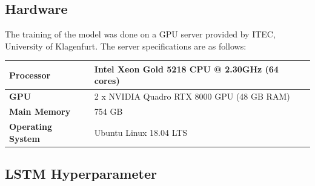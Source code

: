   \subsection{Hardware}
  \label{sec:hardware}

    The training of the  model was done on a GPU server provided by ITEC, University of Klagenfurt. The server specifications are as follows:

    \begin{center}
      \begin{tabular}{| l | l |}
        \hline
        \textbf{Processor}   &   Intel Xeon Gold 5218 CPU @ 2.30GHz (64 cores) \\ \hline
        \textbf{GPU}         &   2 x NVIDIA Quadro RTX 8000 GPU (48 GB RAM)    \\ \hline
        \textbf{Main Memory} &   754 GB                                        \\ \hline
        \textbf{Operating System} &  Ubuntu Linux 18.04 LTS                    \\ \hline

        \hline
      \end{tabular}
      \end{center}



  \subsection{LSTM Hyperparameter}
  \label{sec:lstm-hyperparameters-evaluation-setup}

